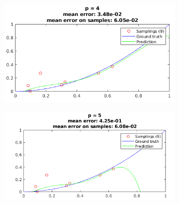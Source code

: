 \documentclass[12pt]{article}
\begin{document}
\begin{figure}[H]
  \centering
  \begin{subfigure}{0.45\textwidth}
    \includegraphics[width=\textwidth]{plots/regression/p_eq_4.png}
  \end{subfigure}
  \begin{subfigure}{0.45\textwidth}
    \includegraphics[width=\textwidth]{plots/regression/p_eq_5.png}
  \end{subfigure}
\end{figure}
\end{document}
